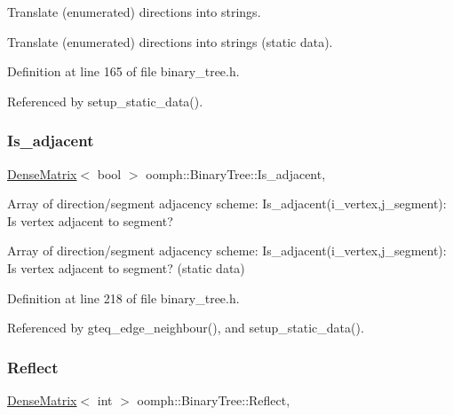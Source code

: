 Translate (enumerated) directions into strings. 

Translate (enumerated) directions into strings (static data). 

Definition at line 165 of file binary\+\_\+tree.\+h.



Referenced by setup\+\_\+static\+\_\+data().

\mbox{\label{classoomph_1_1BinaryTree_ae8d579bfff3e2b7b3c344b6839aaa9f3}} 
\subsubsection{\texorpdfstring{Is\+\_\+adjacent}{Is\_adjacent}}
{\footnotesize\ttfamily \hyperlink{classoomph_1_1DenseMatrix}{Dense\+Matrix}$<$ bool $>$ oomph\+::\+Binary\+Tree\+::\+Is\+\_\+adjacent\hspace{0.3cm}{\ttfamily [static]}, {\ttfamily [private]}}



Array of direction/segment adjacency scheme\+: Is\+\_\+adjacent(i\+\_\+vertex,j\+\_\+segment)\+: Is vertex adjacent to segment? 

Array of direction/segment adjacency scheme\+: Is\+\_\+adjacent(i\+\_\+vertex,j\+\_\+segment)\+: Is vertex adjacent to segment? (static data) 

Definition at line 218 of file binary\+\_\+tree.\+h.



Referenced by gteq\+\_\+edge\+\_\+neighbour(), and setup\+\_\+static\+\_\+data().

\mbox{\label{classoomph_1_1BinaryTree_aa039fcc5eb37f101d449582af4be33fc}} 
\subsubsection{\texorpdfstring{Reflect}{Reflect}}
{\footnotesize\ttfamily \hyperlink{classoomph_1_1DenseMatrix}{Dense\+Matrix}$<$ int $>$ oomph\+::\+Binary\+Tree\+::\+Reflect\hspace{0.3cm}{\ttfamily [static]}, {\ttfamily [private]}}



